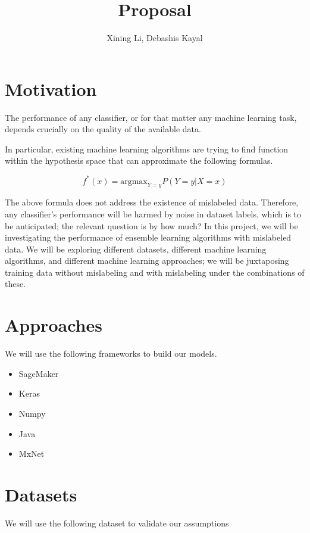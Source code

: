 \documentclass{article}
\author{Xining Li, Debashis Kayal}
\title {Proposal}
\begin{document}
\maketitle

\section{Motivation}

The performance of any classifier, or for that matter any machine learning task, depends crucially on the quality of the available data. 


In particular, existing machine learning algorithms are trying to find function within the hypothesis space that can approximate the following formulas. 

\begin{equation}
    f^*(x) = {\mathrm {argmax}}_{Y=y} P (Y=y|X=x)
\end{equation}

The above formula does not address the existence of mislabeled data. Therefore, any classifier's performance will be harmed by noise in dataset labels, which is to be anticipated; the relevant question is by how much? 
In this project, we will be investigating the performance of ensemble learning algorithms with mislabeled data. We will be exploring different datasets, different machine learning algorithms, and different machine learning approaches; we will be juxtaposing training data without mislabeling and with mislabeling under the combinations of these. 

\section{Approaches}

We will use the following frameworks to build our models. 

\begin{itemize}
    \item SageMaker
    \item Keras
    \item Numpy
    \item Java
    \item MxNet
\end{itemize}

\section{Datasets}

We will use the following dataset to validate our assumptions
\end{document}
